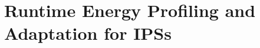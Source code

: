 \chapter{Runtime Energy Profiling and Adaptation for IPSs}
\label{chapter:opta}

\newcommand{\nn}{\textsc{Optic}}
\newcommand{\debs}{\textsc{Debs}}
\newcommand{\symb}[2]{#1_{\text{#2}}}









